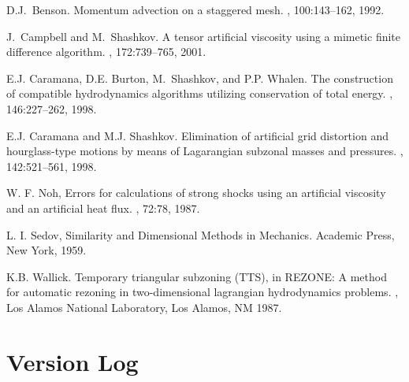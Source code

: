 \documentclass[11pt,letterpaper]{article}
\begin{document}
\begin{thebibliography}{9}


D.J.~Benson.
\newblock Momentum advection on a staggered mesh.
, 100:143--162, 1992.

J.~Campbell and M.~Shashkov.
\newblock A tensor artificial viscosity using a mimetic finite difference
  algorithm.
, 172:739--765, 2001.

E.J. Caramana, D.E. Burton, M.~Shashkov, and P.P. Whalen.
\newblock The construction of compatible hydrodynamics algorithms utilizing
  conservation of total energy.
, 146:227--262, 1998.

E.J. Caramana and M.J. Shashkov.
\newblock Elimination of artificial grid distortion and hourglass-type motions
  by means of {L}agarangian subzonal masses and pressures.
, 142:521--561, 1998.

W. F. Noh,
\newblock Errors for calculations of strong shocks using an artificial viscosity and an artificial heat flux.
, 72:78, 1987.

L. I. Sedov,
\newblock Similarity and Dimensional Methods in Mechanics.
\newblock Academic Press, New York, 1959.

K.B. Wallick.
\newblock Temporary triangular subzoning ({TTS}), in {REZONE}: A method for
  automatic rezoning in two-dimensional lagrangian hydrodynamics problems.
, Los Alamos National Laboratory, Los
  Alamos, NM 1987.

\end{thebibliography}


\appendix
\section{Version Log}
\end{document}

